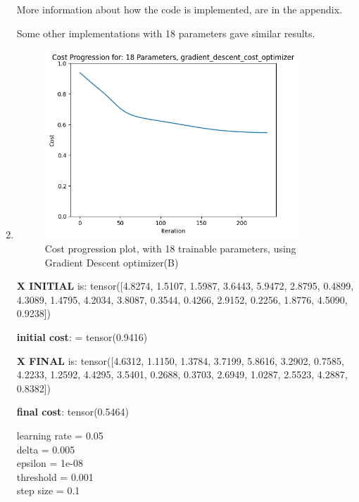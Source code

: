 \documentclass[inscr,ack,preface]{diphdthesis}
\begin{document}
\begin{enumerate}[label=\textbf{\Alph*.}]
More information about how the code is implemented, are in the appendix.

Some other implementations with 18 parameters gave similar results.

\item \textbf{ }
\begin{figure}[H]
\begin{center}
    \includegraphics[width=0.9\textwidth]{18.png}
    \caption{Cost progression plot, with 18 trainable parameters, using Gradient Descent optimizer(B)} 
    \label{fig:enter-label}
    \end{center}
\end{figure}

\textbf{X INITIAL} is: tensor([4.8274, 1.5107, 1.5987, 3.6443, 5.9472, 2.8795, 0.4899, 4.3089, 1.4795,
        4.2034, 3.8087, 0.3544, 0.4266, 2.9152, 0.2256, 1.8776, 4.5090, 0.9238])
        
\textbf{initial cost}: = tensor(0.9416)

\textbf{X FINAL} is: tensor([4.6312, 1.1150, 1.3784, 3.7199, 5.8616, 3.2902, 0.7585, 4.2233, 1.2592,
        4.4295, 3.5401, 0.2688, 0.3703, 2.6949, 1.0287, 2.5523, 4.2887, 0.8382])
        
\textbf{final cost}: tensor(0.5464)

learning rate =  0.05 \\
delta =  0.005 \\
epsilon =  1e-08 \\
threshold =  0.001 \\
step size =  0.1 \\


\end{enumerate}
\end{document}

